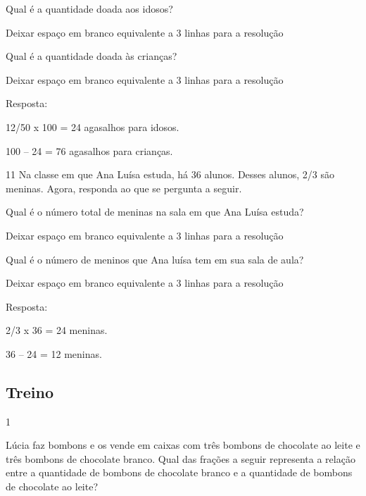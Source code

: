 \begin{mdframed}[linewidth=2pt,linecolor=salmao,roundcorner=2pt]
\begin{escolha}
{{\begin{escolha}
\item
  Qual é a quantidade doada aos idosos?
\end{escolha}

Deixar espaço em branco equivalente a 3 linhas para a resolução

\begin{escolha}
\item
  Qual é a quantidade doada às crianças?
\end{escolha}

Deixar espaço em branco equivalente a 3 linhas para a resolução

Resposta:

\begin{escolha}
\item
  12/50 x 100 = 24 agasalhos para idosos.
\item
  100 -- 24 = 76 agasalhos para crianças.
\end{escolha}

\num{11} Na classe em que Ana Luísa estuda, há 36 alunos. Desses alunos, 2/3
são meninas. Agora, responda ao que se pergunta a seguir.

\begin{escolha}
\item
  Qual é o número total de meninas na sala em que Ana Luísa estuda?
\end{escolha}

Deixar espaço em branco equivalente a 3 linhas para a resolução

\begin{escolha}
\item
  Qual é o número de meninos que Ana luísa tem em sua sala de
  aula?
\end{escolha}

Deixar espaço em branco equivalente a 3 linhas para a resolução

Resposta:

\begin{escolha}
\item
  2/3 x 36 = 24 meninas.
\item
  36 -- 24 = 12 meninas.
\end{escolha}

\subsection{Treino}

\num{1}

Lúcia faz bombons e os vende em caixas com três bombons de chocolate ao leite e três bombons de chocolate branco. Qual das frações a seguir representa a relação entre a quantidade de
bombons de chocolate branco e a quantidade de bombons de chocolate ao leite?

}}
\end{escolha}
\end{mdframed}
